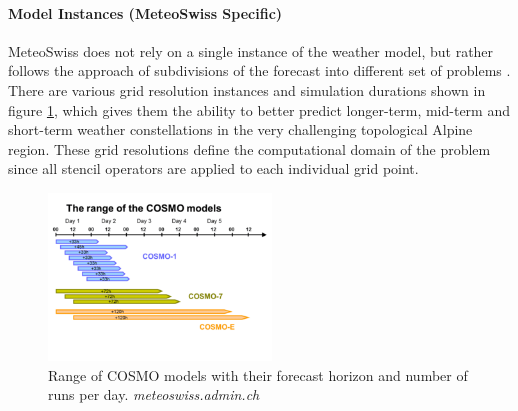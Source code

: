 \paragraph{Model Instances (MeteoSwiss Specific)}
MeteoSwiss does not rely on a single instance of the weather model, but rather follows the approach of subdivisions of the forecast into different set of problems \cite{label51}. There are various grid resolution instances and simulation durations shown in figure \ref{fig:cosmo-prediction}, which gives them the ability to better predict longer-term, mid-term and short-term weather constellations in the very challenging topological Alpine region. These grid resolutions define the computational domain of the problem since all stencil operators are applied to each individual grid point.
\begin{figure}[h]
	\centering
	\includegraphics[height=12em]{images/cosmo-prediction.png}
	\caption{Range of COSMO models with their forecast horizon and number of runs per day. \textit{meteoswiss.admin.ch}}
	\label{fig:cosmo-prediction}
\end{figure}


